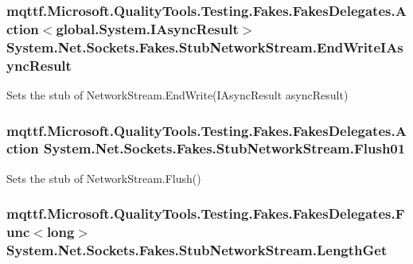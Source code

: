 \hypertarget{class_system_1_1_net_1_1_sockets_1_1_fakes_1_1_stub_network_stream_a7675e9edc46f8d6b9d215056907ff393}{
\subsubsection[{End\-Write\-I\-Async\-Result}]{\setlength{\rightskip}{0pt plus 5cm}mqttf.\-Microsoft.\-Quality\-Tools.\-Testing.\-Fakes.\-Fakes\-Delegates.\-Action$<$global.\-System.\-I\-Async\-Result$>$ System.\-Net.\-Sockets.\-Fakes.\-Stub\-Network\-Stream.\-End\-Write\-I\-Async\-Result}}\label{class_system_1_1_net_1_1_sockets_1_1_fakes_1_1_stub_network_stream_a7675e9edc46f8d6b9d215056907ff393}


Sets the stub of Network\-Stream.\-End\-Write(\-I\-Async\-Result async\-Result)

\hypertarget{class_system_1_1_net_1_1_sockets_1_1_fakes_1_1_stub_network_stream_a44ff40ec4abb0c7512adf694e7f01493}{
\subsubsection[{Flush01}]{\setlength{\rightskip}{0pt plus 5cm}mqttf.\-Microsoft.\-Quality\-Tools.\-Testing.\-Fakes.\-Fakes\-Delegates.\-Action System.\-Net.\-Sockets.\-Fakes.\-Stub\-Network\-Stream.\-Flush01}}\label{class_system_1_1_net_1_1_sockets_1_1_fakes_1_1_stub_network_stream_a44ff40ec4abb0c7512adf694e7f01493}


Sets the stub of Network\-Stream.\-Flush()

\hypertarget{class_system_1_1_net_1_1_sockets_1_1_fakes_1_1_stub_network_stream_a579d38292c72f5aa375b0a4533665ceb}{
\subsubsection[{Length\-Get}]{\setlength{\rightskip}{0pt plus 5cm}mqttf.\-Microsoft.\-Quality\-Tools.\-Testing.\-Fakes.\-Fakes\-Delegates.\-Func$<$long$>$ System.\-Net.\-Sockets.\-Fakes.\-Stub\-Network\-Stream.\-Length\-Get}}\label{class_system_1_1_net_1_1_sockets_1_1_fakes_1_1_stub_network_stream_a579d38292c72f5aa375b0a4533665ceb}


